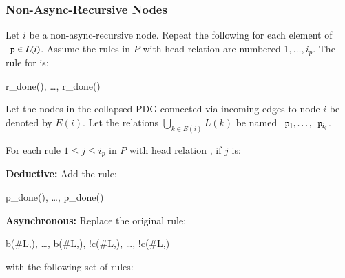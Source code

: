 \subsubsection{Non-Async-Recursive Nodes}
\label{sec:nonasyncrecursive}


Let $i$ be a non-async-recursive node.  Repeat the following for each element of $\dedalus{p} \in L(i)$.
Assume the rules in $P$ with head relation
 are numbered $1, \ldots, i_p$.  The rule for 
is:

\begin{Drules}
        {r_done(), \ldots, r_done()}
\end{Drules}

Let the nodes in the collapsed PDG connected via incoming edges to node $i$ be denoted by $E(i)$.  Let the relations $\bigcup_{k \in E(i)} L(k)$ be named $\dedalus{p}_1, \ldots, \dedalus{p}_{i_q}$.

For each rule $1 \leq j \leq i_p$ in $P$ with head relation , if $j$ is:

\noindent
\textbf{Deductive:}
Add the rule:

\begin{Drules}
        {p_done(), \ldots, p_done()}
\end{Drules}

\noindent
\textbf{Asynchronous:}
Replace the original rule:

\begin{Drules}
        {b(#L,), \ldots, b(#L,), !c(#L,), \ldots, !c(#L,)}
\end{Drules}

with the following set of rules:


